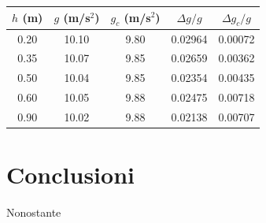 \begin{center}
\begin{tabular}{c|c|c|c|c}
$h$ (m) & $g$ (m/s$^2$) & $g_c$ (m/s$^2$) & $\Delta g/g$ & $\Delta g_c/g$\\
\midrule
0.20 & 10.10 & 9.80 & 0.02964 & 0.00072 \\
0.35 & 10.07 & 9.85 & 0.02659 & 0.00362 \\
0.50 & 10.04 & 9.85 & 0.02354 & 0.00435 \\
0.60 & 10.05 & 9.88 & 0.02475 & 0.00718 \\
0.90 & 10.02 & 9.88 & 0.02138 & 0.00707 \\
\end{tabular}
\end{center}


\section{Conclusioni}
Nonostante 

